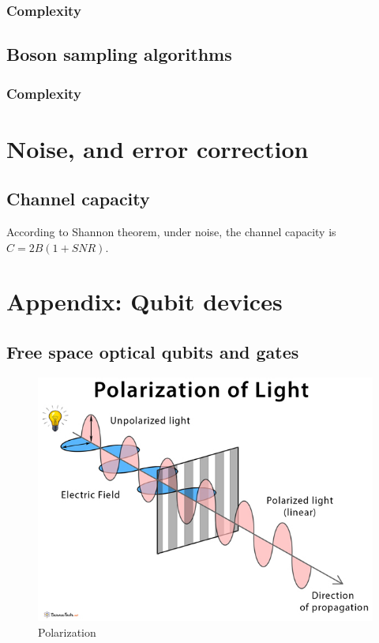 \documentclass{book}
\begin{document}
\subsection{Complexity}

\section{Boson sampling algorithms}

\subsection{Complexity}

\chapter{Noise, and error correction}
\section{Channel capacity}
According to Shannon theorem, under noise, the channel capacity is $C = 2B (1+SNR)$.


\chapter{Appendix: Qubit devices}\label{A-qubit}

\section{Free space optical qubits and gates}
\begin{figure}[h]
\includegraphics[width=12cm]{pic/Polarization-of-Light.jpg}
\caption{Polarization}
\label{Polarizer}
\end{figure}
\end{document}
